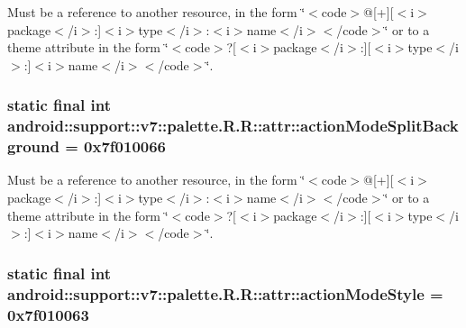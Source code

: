 Must be a reference to another resource, in the form \char`\"{}$<$code$>$@\mbox{[}+\mbox{]}\mbox{[}$<$i$>$package$<$/i$>$:\mbox{]}$<$i$>$type$<$/i$>$:$<$i$>$name$<$/i$>$$<$/code$>$\char`\"{} or to a theme attribute in the form \char`\"{}$<$code$>$?\mbox{[}$<$i$>$package$<$/i$>$:\mbox{]}\mbox{[}$<$i$>$type$<$/i$>$:\mbox{]}$<$i$>$name$<$/i$>$$<$/code$>$\char`\"{}. \hypertarget{classandroid_1_1support_1_1v7_1_1palette_1_1_r_1_1attr_16afcf0912f048b042d2a13566752a8f}{
\subsubsection[{actionModeSplitBackground}]{\setlength{\rightskip}{0pt plus 5cm}static final int android::support::v7::palette.R.R::attr::actionModeSplitBackground = 0x7f010066}}
\label{classandroid_1_1support_1_1v7_1_1palette_1_1_r_1_1attr_16afcf0912f048b042d2a13566752a8f}


Must be a reference to another resource, in the form \char`\"{}$<$code$>$@\mbox{[}+\mbox{]}\mbox{[}$<$i$>$package$<$/i$>$:\mbox{]}$<$i$>$type$<$/i$>$:$<$i$>$name$<$/i$>$$<$/code$>$\char`\"{} or to a theme attribute in the form \char`\"{}$<$code$>$?\mbox{[}$<$i$>$package$<$/i$>$:\mbox{]}\mbox{[}$<$i$>$type$<$/i$>$:\mbox{]}$<$i$>$name$<$/i$>$$<$/code$>$\char`\"{}. \hypertarget{classandroid_1_1support_1_1v7_1_1palette_1_1_r_1_1attr_81efe78ba7970c2428b1b99868f7fe1c}{
\subsubsection[{actionModeStyle}]{\setlength{\rightskip}{0pt plus 5cm}static final int android::support::v7::palette.R.R::attr::actionModeStyle = 0x7f010063}}
\label{classandroid_1_1support_1_1v7_1_1palette_1_1_r_1_1attr_81efe78ba7970c2428b1b99868f7fe1c}


